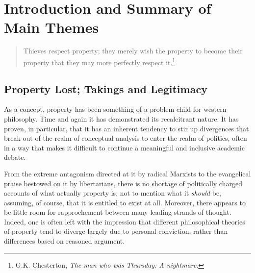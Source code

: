\chapter{Introduction and Summary of Main Themes}\label{chap:intro}

\begin{quote}
Thieves respect property; they merely wish the property to become their property that they may more perfectly respect it.\footnote{G.K. Chesterton, {\it The man who was Thursday: A nightmare}.}
\end{quote}
%
%
%
\section{Property Lost; Takings and Legitimacy}

As a concept, property has been something of a problem child for western philosophy. Time and again it has demonstrated its recalcitrant nature. It has proven, in particular, that it has an inherent tendency to stir up divergences that break out of the realm of conceptual analysis to enter the realm of politics, often in a way that makes it difficult to continue a meaningful and inclusive academic debate.

From the extreme antagonism directed at it by radical Marxists to the evangelical praise bestowed on it by libertarians, there is no shortage of politically charged accounts of what actually property is, not to mention what it {\it should} be, assuming, of course, that it is entitled to exist at all. 
Moreover, there appears to be little room for rapprochement between many leading strands of thought. Indeed, one is often left with the impression that different philosophical theories of property tend to diverge largely due to personal conviction, rather than differences based on reasoned argument. %

